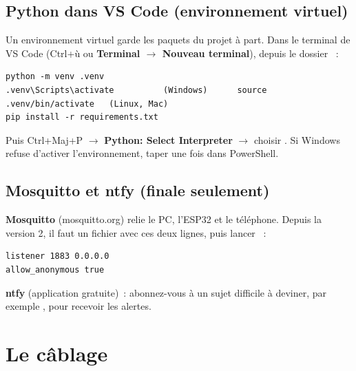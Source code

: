 \subsection{Python dans VS Code (environnement virtuel)}
Un environnement virtuel garde les paquets du projet à part. Dans le terminal de VS Code (Ctrl+ù ou \textbf{Terminal $\rightarrow$ Nouveau terminal}), depuis le dossier ~:
\begin{lstlisting}[style=cmd]
python -m venv .venv
.venv\Scripts\activate          (Windows)      source .venv/bin/activate   (Linux, Mac)
pip install -r requirements.txt
\end{lstlisting}
Puis Ctrl+Maj+P $\rightarrow$ \textbf{Python: Select Interpreter} $\rightarrow$ choisir . Si Windows refuse d'activer l'environnement, taper une fois  dans PowerShell.

\subsection{Mosquitto et ntfy (finale seulement)}
\textbf{Mosquitto} (mosquitto.org) relie le PC, l'ESP32 et le téléphone. Depuis la version 2, il faut un fichier  avec ces deux lignes, puis lancer ~:
\begin{lstlisting}[style=cmd]
listener 1883 0.0.0.0
allow_anonymous true
\end{lstlisting}
\textbf{ntfy} (application gratuite)~: abonnez-vous à un sujet difficile à deviner, par exemple , pour recevoir les alertes.

\section{Le câblage}\label{sec:cablage}

